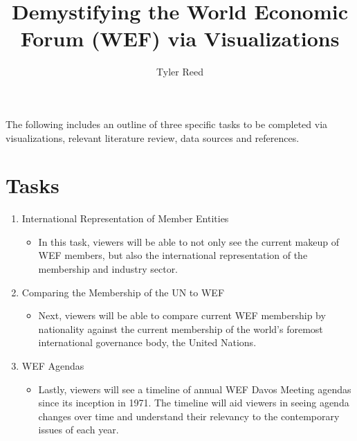 \documentclass[journal]{vgtc}                %
\title{Demystifying the World Economic Forum (WEF) via Visualizations}
\author{Tyler Reed}
\begin{document}


\maketitle

The following includes an outline of three specific tasks to be completed via visualizations, relevant literature review, data sources and references.  %

\section{Tasks}

\begin{enumerate}
\item International Representation of Member Entities
    \begin{itemize}
        \item In this task, viewers will be able to not only see the current makeup of WEF members, but also the international representation of the membership and industry sector. 
    \end{itemize}
\item Comparing the Membership of the UN to WEF
    \begin{itemize}
        \item Next, viewers will be able to compare current WEF membership by nationality against the current membership of the world's foremost international governance body, the United Nations. 
    \end{itemize}
\item WEF Agendas
    \begin{itemize}
        \item Lastly, viewers will see a timeline of annual WEF Davos Meeting agendas since its inception in 1971. The timeline will aid viewers in seeing agenda changes over time and understand their relevancy to the contemporary issues of each year. 
    \end{itemize}
    
\end{enumerate}
\end{document}
